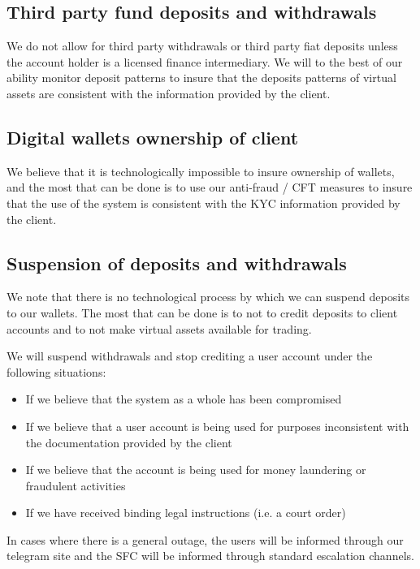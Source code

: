 \subsection{Third party fund deposits and withdrawals}
We do not allow for third party withdrawals or third party fiat
deposits unless the account holder is a licensed finance intermediary.
We will to the best of our ability monitor deposit patterns to insure
that the deposits patterns of virtual assets are consistent with the
information provided by the client.

\subsection{Digital wallets ownership of client}
We believe that it is technologically impossible to insure ownership
of wallets, and the most that can be done is to use our anti-fraud /
CFT measures to insure that the use of the system is consistent with
the KYC information provided by the client.

\subsection{Suspension of deposits and withdrawals}
We note that there is no technological process by which we can suspend
deposits to our wallets.  The most that can be done is to not to
credit deposits to client accounts and to not make virtual assets
available for trading.

We will suspend withdrawals and stop crediting a user account under
the following situations:
\begin{itemize}
\item If we believe that the system as a whole has been compromised
\item If we believe that a user account is being used for purposes
  inconsistent with the documentation provided by the client
\item If we believe that the account is being used for money
  laundering or fraudulent activities
\item If we have received binding legal instructions (i.e. a court order)
\end{itemize}

In cases where there is a general outage, the users will be informed
through our telegram site and the SFC will be informed through
standard escalation channels.

